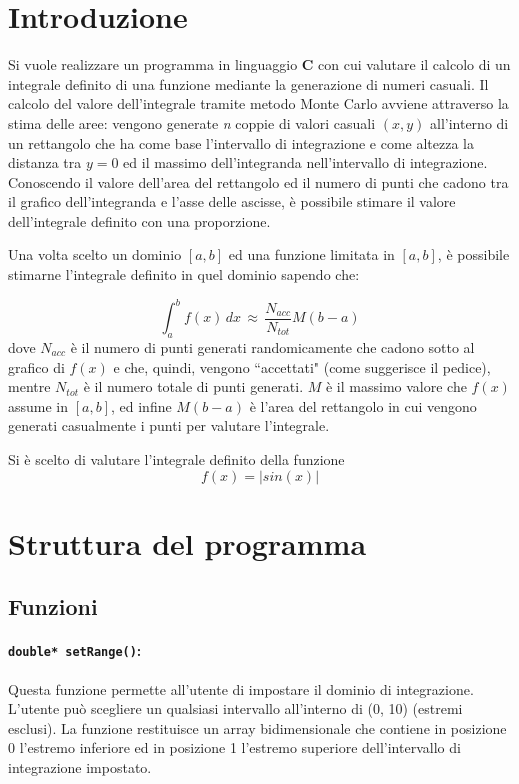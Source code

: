 \documentclass[a4paper, 12pt, oneside]{article}
\begin{document}
	
		
	\newpage
	
	\section{Introduzione}
	\label{intro}
	Si vuole realizzare un programma in linguaggio \textbf{C} con cui valutare il calcolo di un integrale definito di una funzione mediante la generazione di numeri casuali. Il calcolo del valore dell'integrale tramite metodo Monte Carlo avviene attraverso la stima delle aree: vengono generate \textit{n} coppie di valori casuali $(x, y)$ all'interno di un rettangolo che ha come base l'intervallo di integrazione e come altezza la distanza tra $y = 0$ ed il massimo dell'integranda nell'intervallo di integrazione. Conoscendo il valore dell'area del rettangolo ed il numero di punti che cadono tra il grafico dell'integranda e l'asse delle ascisse, è possibile stimare il valore dell'integrale definito con una proporzione.
	
	Una volta scelto un dominio $[a, b]$ ed una funzione limitata in $[a, b]$, è possibile stimarne l'integrale definito in quel dominio sapendo che:
	
	$$\int_{a}^{b}f(x)\,dx\,\approx\,\frac{N_{acc}}{N_{tot}}M(b - a)$$
	dove $N_{acc}$ è il numero di punti generati randomicamente che cadono sotto al grafico di $f(x)$ e che, quindi, vengono ``accettati" (come suggerisce il pedice), mentre $N_{tot}$ è il numero totale di punti generati. $M$ è il massimo valore che $f(x)$ assume in $[a, b]$, ed infine $M(b - a)$ è l'area del rettangolo in cui vengono generati casualmente i punti per valutare l'integrale.
	
	Si è scelto di valutare l'integrale definito della funzione
	$$f(x) = |sin(x)|$$
	
	\newpage
	\section{Struttura del programma}
		\subsection{Funzioni}
			\paragraph{\texttt{double* setRange()}:}
			Questa funzione permette all'utente di impostare il dominio di integrazione. L'utente può scegliere un qualsiasi intervallo all'interno di (0, 10) (estremi esclusi). La funzione restituisce un array bidimensionale che contiene in posizione 0 l'estremo inferiore ed in posizione 1 l'estremo superiore dell'intervallo di integrazione impostato.
			
\end{document}
